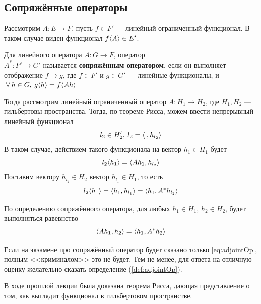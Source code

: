 \documentclass[12pt]{article}
\begin{document}
	\subsection{Сопряжённые операторы}

		Рассмотрим $A: E \rightarrow F$, пусть $f\in F'$ --- линейный ограниченный функционал.
		В таком случае виден функционал $f\langle A \rangle \in E'$.
	
		\begin{defi} \label{def:adjointOp}
			Для линейного оператора $A: G \rightarrow F$, оператор \\$A^{*}: F' \rightarrow G'$ 
			называется \textbf{сопряжённым оператором}, если он выполняет отображение $f \mapsto g$,
			где $f \in F'$ и $g \in G'$ --- линейные функционалы, и $\forall h \in G, \: g\angular{h} = f\angular{Ah}$
		\end{defi}
	
		Тогда рассмотрим линейный ограниченный оператор $A: H_1 \rightarrow H_2 $, 
		где $H_1, H_2$ --- гильбертовы пространства. Тогда, по теореме Рисса, можем ввести
		непрерывный линейный функционал 
		$$l_2 \in H_2', \: l_2 = \left\langle \:, h_{l_2} \right\rangle$$
		В таком случае, действием такого функционала на вектор $h_1 \in H_1$ будет
		$$l_2 \langle h_1 \rangle = \left\langle A h_1, h_{l_2} \right\rangle$$
		Поставим вектору $h_{l_2} \in H_2$ вектор $h_{l_1} \in H_1$, то есть
		$$ l_2 \langle h_1 \rangle = \left\langle h_1, h_{l_1} \right\rangle = \left\langle h_1, A^{*} h_{l_2} \right\rangle$$
	
		По определению сопряжённого оператора, для любых $h_1 \in H_1$, $h_2 \in H_2$, будет выполняться равевнство
		\begin{equation} \label{eq:adjointOp}
			\left\langle A h_1, h_2 \right\rangle = \left\langle h_1, A^{*} h_2 \right\rangle
		\end{equation}
	
		{ \color{gray}
			Если на экзамене про сопряжённый оператор будет сказано только \eqref{eq:adjointOp}, полным <<криминалом>> это не будет.
			Тем не менее, для ответа на отличную оценку желательно сказать определение (\ref{def:adjointOp}).
		}


		В ходе прошлой лекции была доказана теорема Рисса, дающая представление о том, как выглядит функционал в гильбертовом пространстве.
	
\end{document}
